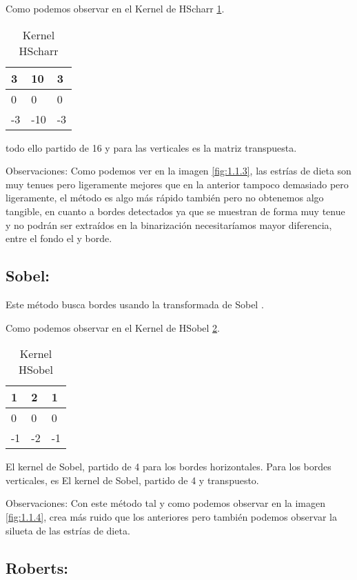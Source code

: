 Como podemos observar en el Kernel de HScharr \ref{F_k3}.
\begin{table}[]
	\centering
	\caption{Kernel HScharr}
	\label{F_k3}
	\begin{tabular}{|l|l|l|}
		\hline
		3  & 10  & 3 \\ \hline
		0  & 0   & 0 \\ \hline
		-3 & -10 & -3 \\ \hline
	\end{tabular}
\end{table}
todo ello partido de 16 y para las verticales es la matriz transpuesta. 




Observaciones:
Como podemos ver en la imagen \ref{fig:1.1.3}, las estrías de dieta son muy tenues pero ligeramente mejores que en la anterior tampoco demasiado pero ligeramente, el método es algo más rápido también pero no obtenemos algo tangible, en cuanto  a bordes detectados ya que se muestran de forma muy tenue y no podrán ser extraídos en la binarización necesitaríamos mayor diferencia, entre el fondo el y borde.




\subsection{Sobel:}
Este método busca bordes usando la transformada de Sobel \cite{wiki:Sobel}.


Como podemos observar en el Kernel de HSobel \ref{F_k4}.
\begin{table}[]
	\centering
	\caption{Kernel HSobel}
	\label{F_k4}
	\begin{tabular}{|l|l|l|}
		\hline
		1  & 2  & 1 \\ \hline
		0  & 0  & 0 \\ \hline
		-1 & -2 & -1 \\ \hline
	\end{tabular}
\end{table}

El kernel de Sobel, partido de 4 para los bordes horizontales.
Para los bordes verticales, es El kernel de Sobel, partido de 4 y transpuesto. 

Observaciones: 
Con este método tal y como podemos observar en la imagen \ref{fig:1.1.4}, crea más ruido que los anteriores pero también podemos observar la silueta de las estrías de dieta.


\subsection{Roberts:}

